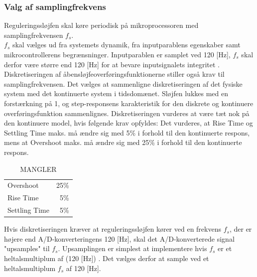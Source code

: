 \subsubsection{Valg af samplingfrekvens}\label{subsec:choosefs}
Reguleringssløjfen skal køre periodisk på mikroprocessoren
med samplingfrekvensen \(f_s\). \\
\(f_s\) skal vælges
ud fra systemets dynamik,
fra inputparablens egenskaber samt 
mikrocontrollerens begrænsninger. 
Inputparablen er samplet ved 120 [Hz], 
\(f_s\) skal derfor være større end 120 [Hz] for at bevare inputsignalets integritet \citep[Kap. 2.1]{dsp}. 
Diskretiseringen af åbensløjfeoverføringsfunktionerne stiller også krav til samplingfrekvensen.
Det vælges at sammenligne diskretiseringen af det fysiske system med det kontinuerte system i tidsdomænet.
Sløjfen lukkes med en forstærkning på 1, 
og step-responsens karakteristik for den diskrete og kontinuere overføringsfunktion sammenlignes. 
Diskretiseringen vurderes at være tæt nok på den kontinuere model, hvis følgende krav opfyldes:
Det vurderes, at Rise Time og Settling Time maks. må ændre sig med 5\% i forhold
til den kontinuerte respons, mens at Overshoot maks. må ændre sig med 25\% i forhold til
den kontinuerte respons.

\begin{table}
 \centering
\begin{tabular}{lr}
 Overshoot & 25\%\\
 Rise Time & 5\%\\
 Settling Time & 5\%\\
\end{tabular}
\caption[MANGLER]{MANGLER}
\end{table}

Hvis diskretiseringen kræver at reguleringssløjfen kører ved en frekvens \(f_s\),
der er højere end A/D-konverteringens 120 [Hz], skal det A/D-konverterede
signal "upsamples" til \(f_s\).
Upsamplingen er simplest at implementere
hvis \(f_s\) er et heltalsmultiplum af (120 [Hz]) \citep[Side. 562]{dsp}.
Det vælges derfor at sample ved et heltalsmultiplum \(f_s\) af 120 [Hz].

